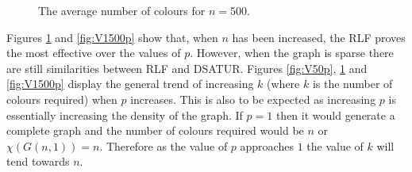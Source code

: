 \begin{figure}[H]
    \centering
    \caption{The average number of colours for $n = 500$.}
    \label{fig:V500p}
\end{figure}

Figures \ref{fig:V500p} and \ref{fig:V1500p} show that, when $n$ has been increased, the RLF proves the most effective over the values of $p$. However, when the graph is sparse there are still similarities between RLF and DSATUR. Figures \ref{fig:V50p}, \ref{fig:V500p} and \ref{fig:V1500p} display the general trend of increasing $k$ (where $k$ is the number of colours required) when $p$ increases. This is also to be expected as increasing $p$ is essentially increasing the density of the graph. If $p = 1$ then it would generate a complete graph and the number of colours required would be $n$ or $\chi(G(n, 1)) = n$. Therefore as the value of $p$ approaches $1$ the value of $k$ will tend towards $n$.  

